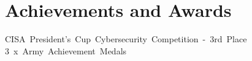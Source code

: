\documentclass[letterpaper,11pt]{article}
\begin{document}
\section{\textbf{Achievements and Awards}}
\setlength{\columnsep}{50pt}
\begin{itemize}[noitemsep]
	\small{\item[] {\mbox{CISA President's Cup Cybersecurity Competition - 3rd Place} \hspace{1cm}
		\mbox{3 x Army Achievement Medals}
		}}
\end{itemize}

\end{document}
